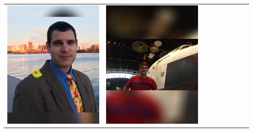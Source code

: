 \documentclass[landscape,a0paper,fontscale=0.292]{baposter}
\begin{document}
\begin{poster}
{\begin{center}
\begin{tabularx}{\linewidth}{X X X X X X X X X}
{\centering \includegraphics[width=0.65\linewidth]{novitzky.jpg}}&
{\centering \includegraphics[width=0.65\linewidth]{pazis.jpg}}&

\end{tabularx}
\end{center}}
\end{poster}
\end{document}
